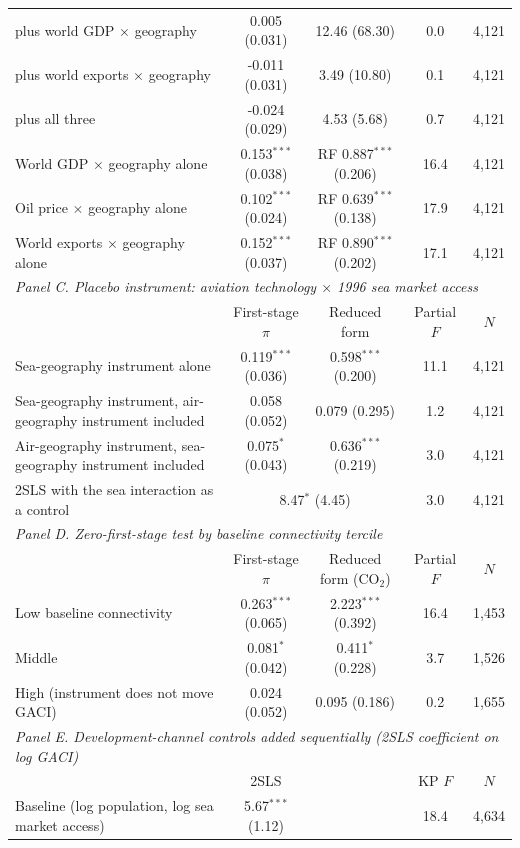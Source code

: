 \documentclass[12pt]{article}
\begin{document}
\begin{table}[htbp]
\begin{threeparttable}
\begin{tabular}{lcccc}
  \quad plus world GDP $\times$ geography & 0.005 (0.031) & 12.46 (68.30) & 0.0 & 4,121 \\
  \quad plus world exports $\times$ geography & -0.011 (0.031) & 3.49 (10.80) & 0.1 & 4,121 \\
  \quad plus all three & -0.024 (0.029) & 4.53 (5.68) & 0.7 & 4,121 \\
  World GDP $\times$ geography alone & 0.153$^{***}$ (0.038) & RF 0.887$^{***}$ (0.206) & 16.4 & 4,121 \\
  Oil price $\times$ geography alone & 0.102$^{***}$ (0.024) & RF 0.639$^{***}$ (0.138) & 17.9 & 4,121 \\
  World exports $\times$ geography alone & 0.152$^{***}$ (0.037) & RF 0.890$^{***}$ (0.202) & 17.1 & 4,121 \\
\midrule
\multicolumn{5}{l}{\textit{Panel C. Placebo instrument: aviation technology $\times$ 1996 sea market access}} \\
 & First-stage $\pi$ & Reduced form & Partial $F$ & $N$ \\
  Sea-geography instrument alone & 0.119$^{***}$ (0.036) & 0.598$^{***}$ (0.200) & 11.1 & 4,121 \\
  Sea-geography instrument, air-geography instrument included & 0.058 (0.052) & 0.079 (0.295) & 1.2 & 4,121 \\
  Air-geography instrument, sea-geography instrument included & 0.075$^{*}$ (0.043) & 0.636$^{***}$ (0.219) & 3.0 & 4,121 \\
  \quad 2SLS with the sea interaction as a control & \multicolumn{2}{c}{8.47$^{*}$ (4.45)} & 3.0 & 4,121 \\
\midrule
\multicolumn{5}{l}{\textit{Panel D. Zero-first-stage test by baseline connectivity tercile}} \\
 & First-stage $\pi$ & Reduced form (CO$_2$) & Partial $F$ & $N$ \\
  Low baseline connectivity & 0.263$^{***}$ (0.065) & 2.223$^{***}$ (0.392) & 16.4 & 1,453 \\
  Middle & 0.081$^{*}$ (0.042) & 0.411$^{*}$ (0.228) & 3.7 & 1,526 \\
  High (instrument does not move GACI) & 0.024 (0.052) & 0.095 (0.186) & 0.2 & 1,655 \\
\midrule
\multicolumn{5}{l}{\textit{Panel E. Development-channel controls added sequentially (2SLS coefficient on log GACI)}} \\
 & 2SLS & & KP $F$ & $N$ \\
  Baseline (log population, log sea market access) & 5.67$^{***}$ (1.12) & & 18.4 & 4,634 \\

\end{tabular}
\end{threeparttable}
\end{table}
\end{document}
